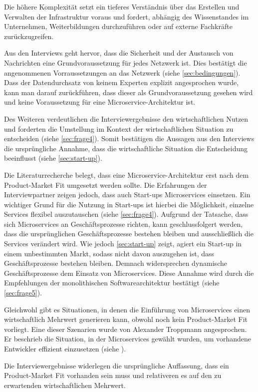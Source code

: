 Die höhere Komplexität setzt ein tieferes Verständnis über das Erstellen und Verwalten der Infrastruktur voraus und fordert, abhängig des Wissenstandes im Unternehmen, Weiterbildungen durchzuführen oder auf externe Fachkräfte zurückzugreifen.

\label{sec:netzwerk}
Aus den Interviews geht hervor, dass die Sicherheit und der Austausch von Nachrichten eine Grundvoraussetzung für jedes Netzwerk ist. Dies bestätigt die angenommenen Vorraussetzungen an das Netzwerk (siehe \cref{sec:bedingungen}). Dass der Datendurchsatz von keinem Experten explizit angesprochen wurde, kann man darauf zurückführen, dass dieser als Grundvoraussetzung gesehen wird und keine Voraussetzung für eine Microservice-Architektur ist.

Des Weiteren verdeutlichen die Interviewergebnisse den wirtschaftlichen Nutzen und forderten die Umstellung im Kontext der wirtschaftlichen Situation zu entscheiden (siehe \cref{sec:frage4}). Somit bestätigen die Aussagen aus den Interviews die ursprüngliche Annahme, dass die wirtschaftliche Situation die Entscheidung beeinflusst (siehe \cref{sec:start-up}).

Die Literaturrecherche belegt, dass eine Microservice-Architektur erst nach dem Product-Market Fit umgesetzt werden sollte. Die Erfahrungen der Interviewpartner zeigen jedoch, dass auch Start-ups Microservices einsetzen. Ein wichtiger Grund für die Nutzung in Start-ups ist hierbei die Möglichkeit, einzelne Services flexibel auszutauschen (siehe \cref{sec:frage4}). Aufgrund der Tatsache, dass sich Microservices an Geschäftsprozesse richten, kann geschlussfolgert werden, dass die ursprünglichen Geschäftsprozesse bestehen bleiben und ausschließlich die Services verändert wird. Wie jedoch \cref{sec:start-up} zeigt, agiert ein Start-up in einem unbestimmten Markt, sodass nicht davon auszugehen ist, dass Geschäftsprozesse bestehen bleiben. Demnach widersprechen dynamische Geschäftsprozesse dem Einsatz von Microservices. Diese Annahme wird durch die Empfehlungen der monolithischen Softwarearchitektur bestätigt (siehe \cref{sec:frage5}).

Gleichwohl gibt es Situationen, in denen die Einführung von Microservices einen wirtschaftlich Mehrwert generieren kann, obwohl noch kein Product-Market Fit vorliegt. Eine dieser Szenarien wurde von Alexander Troppmann angesprochen. Er beschrieb die Situation, in der Microservices gewählt wurden, um vorhandene Entwickler effizient einzusetzen (siehe ).

\label{sec:wirtschaftlich}
Die Interviewergebnisse widerlegen die ursprüngliche Auffassung, dass ein Product-Market Fit vorhanden sein muss und relativeren es auf den zu erwartenden wirtschaftlichen Mehrwert.

